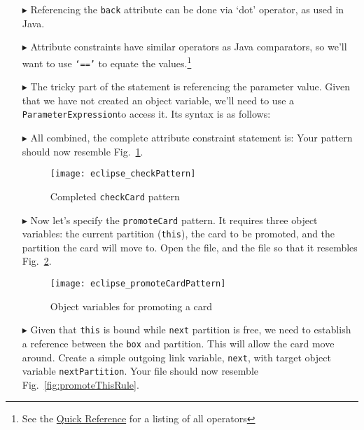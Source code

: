 \begin{itemize}
\item[$\blacktriangleright$] Referencing the \texttt{back} attribute can be done via `dot' operator, as used in Java.

\item[$\blacktriangleright$] Attribute constraints have similar operators as Java comparators, so we'll want to use \texttt{`=='} to equate the
values.\footnote{See the \hyperlink{quickRef}{Quick Reference} for a listing of all operators}

\item[$\blacktriangleright$] The tricky part of the statement is referencing the parameter value. Given that we have not created an object variable, we'll need
to use a \texttt{ParameterExpression}to access it. Its syntax is as follows: 

\item[$\blacktriangleright$] All combined, the complete attribute constraint statement is:  Your pattern should now resemble
Fig.~\ref{fig:checkPattern}.

\begin{figure}[htbp]
\begin{center}
  \texttt{[image: eclipse\_checkPattern]}
  \caption{Completed \texttt{checkCard} pattern}
  \label{fig:checkPattern}
\end{center}
\end{figure} 

\clearpage

\item[$\blacktriangleright$] Now let's specify the \texttt{promoteCard} pattern. It requires three object variables: the current partition (\texttt{this}),
the card to be promoted, and the partition the card will move to. Open the file, and the file so that it resembles Fig.~\ref{fig:promoteCardPattern}.

\begin{figure}[htbp]
\begin{center}
  \texttt{[image: eclipse\_promoteCardPattern]}
  \caption{Object variables for promoting a card}
  \label{fig:promoteCardPattern}
\end{center}
\end{figure} 

\item[$\blacktriangleright$] Given that \texttt{this} is bound while \texttt{next} partition is free, we need to establish a reference between the \texttt{box}
and partition. This will allow the card move around. Create a simple outgoing link variable, \texttt{next},  with target object variable \texttt{nextPartition}.
Your file should now resemble Fig.~\ref{fig:promoteThisRule}.


\end{itemize}
